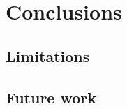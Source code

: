 \chapter{Conclusions}
\label{chp:future_work_and_conclusions}






\section{Limitations}





\section{Future work}
\label{sec:future_work}




